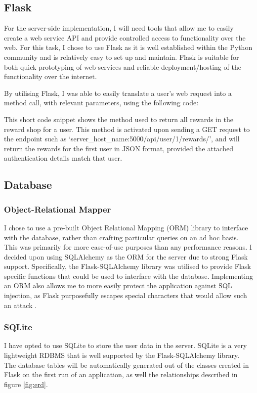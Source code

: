 \subsection{Flask}
For the server-side implementation, I will need tools that allow me to easily create a web service API and provide controlled access to functionality over the web.
For this task, I chose to use Flask as it is well established within the Python community and is relatively easy to set up and maintain. 
Flask is suitable for both quick prototyping of web-services and reliable deployment/hosting of the functionality over the internet.

By utilising Flask, I was able to easily translate a user's web request into a method call, with relevant parameters, using the following code:

This short code snippet shows the method used to return all rewards in the reward shop for a user.
This method is activated upon sending a GET request to the endpoint such as `server\_host\_name:5000/api/user/1/rewards/', and will return the rewards for the first user in JSON format, provided the attached authentication details match that user. 

\subsection{Database}
\subsubsection{Object-Relational Mapper}
I chose to use a pre-built Object Relational Mapping (ORM) library to interface with the database, rather than crafting particular queries on an ad hoc basis. 
This was primarily for more ease-of-use purposes than any performance reasons. 
I decided upon using SQLAlchemy as the ORM for the server due to strong Flask support.
Specifically, the Flask-SQLAlchemy library was utilised to provide Flask specific functions that could be used to interface with the database.
Implementing an ORM also allows me to more easily protect the application against SQL injection, as Flask purposefully escapes special characters that would allow such an attack \citep[p.15]{copeland2008essential}.

\subsubsection{SQLite}
I have opted to use SQLite to store the user data in the server.
SQLite is a very lightweight RDBMS that is well supported by the Flask-SQLAlchemy library.
The database tables will be automatically generated out of the classes created in Flask on the first run of an application, as well the relationships described in figure \ref{fig:erd}. 

